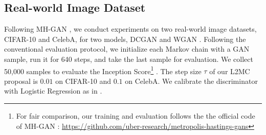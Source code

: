 \documentclass[runningheads]{llncs}
\newcommand{\<}{\left\langle}
\renewcommand{\>}{\right\rangle}
\begin{document}
\subsection{Real-world Image Dataset}

Following MH-GAN \cite{turner2019metropolis}, we conduct experiments on two real-world image datasets, CIFAR-10 and CelebA, for two models, DCGAN \cite{radford2015unsupervised} and WGAN \cite{arjovsky2017wasserstein}. 
Following the conventional evaluation protocol, we initialize each Markov chain with a GAN sample, run it for 640 steps, and take the last sample for evaluation. We collect 50,000 samples to evaluate the Inception Score\footnote{For fair comparison, our training and evaluation follows the the official code of MH-GAN \cite{turner2019metropolis}: \url{https://github.com/uber-research/metropolis-hastings-gans}} \cite{salimans2016improved}. 
The step size $\tau$ of our L2MC proposal is $0.01$ on CIFAR-10 and $0.1$ on CelebA. We calibrate the discriminator with Logistic Regression as in \cite{turner2019metropolis}. 


\end{document}
